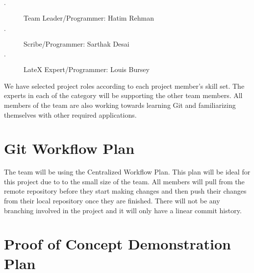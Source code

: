 \documentclass{article}
\begin{document}
\begin {description}
  \item[$\cdot$] Team Leader/Programmer: Hatim Rehman
  \item[$\cdot$] Scribe/Programmer: Sarthak Desai
  \item[$\cdot$] LateX Expert/Programmer: Louis Bursey
\end {description}

We have selected project roles according to each project member's skill set. The experts in each of the category will be supporting the other team members. All members of the team are also working towards learning Git and familiarizing themselves with other required applications.

\section{Git Workflow Plan}
The team will be using the Centralized Workflow Plan. This plan will be ideal for this project due to to the small size of the team. All members will pull from the remote repository before they start making changes and then push their changes from their local repository once they are finished. There will not be any branching involved in the project and it will only have a linear commit history.

\section{Proof of Concept Demonstration Plan} %
\end{document}
